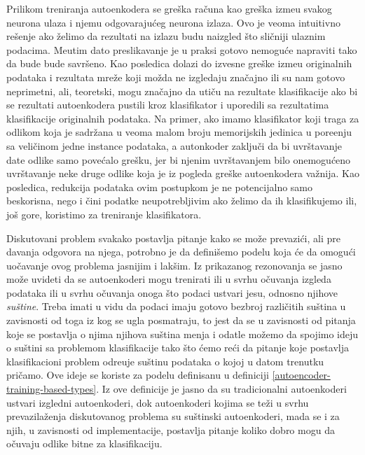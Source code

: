 \documentclass{article}
\begin{document}
	Prilikom treniranja autoenkodera se gre\v ska ra\v cuna kao gre\v ska izme\dj u svakog neurona ulaza i njemu odgovaraju\'ceg neurona izlaza. 
	Ovo je veoma intuitivno re\v senje ako \v zelimo da rezultati na izlazu budu naizgled \v sto sli\v cniji ulaznim podacima. 
	Me\dj utim dato preslikavanje je u praksi gotovo nemogu\'ce napraviti tako da bude bude savr\v seno.
	Kao posledica dolazi do izvesne gre\v ske izme\dj u originalnih podataka i rezultata mre\v ze koji mo\v zda ne izgledaju zna\v cajno ili su nam gotovo neprimetni, ali, teoretski, mogu zna\v cajno da uti\v cu na rezultate klasifikacije ako bi se rezultati autoenkodera pustili kroz klasifikator i uporedili sa rezultatima klasifikacije originalnih podataka.
	Na primer, ako imamo klasifikator koji traga za odlikom koja je sadr\v zana u veoma malom broju memorijskih jedinica u pore\dj enju sa veli\v cinom jedne instance podataka, a autonkoder zaklju\v ci da bi uvr\v stavanje date odlike samo pove\'calo gre\v sku, jer bi njenim uvr\v stavanjem bilo onemogu\'ceno uvr\v stavanje neke druge odlike koja je iz pogleda gre\v ske autoenkodera va\v znija.
	Kao posledica, redukcija podataka ovim postupkom je ne potencijalno samo beskorisna, nego i \v cini podatke neupotrebljivim ako \v zelimo da ih klasifikujemo ili, jo\v s gore, koristimo za treniranje klasifikatora.
	
	Diskutovani problem svakako postavlja pitanje kako se mo\v ze prevazi\'ci, ali pre davanja odgovora na njega, potrobno je da defini\v semo podelu koja \'ce da omogu\'ci uo\v cavanje ovog problema jasnijim i lak\v sim. 
	Iz prikazanog rezonovanja se jasno mo\v ze uvideti da se autoenkoderi mogu trenirati ili u svrhu o\v cuvanja izgleda podataka ili u svrhu o\v cuvanja onoga \v sto podaci ustvari jesu, odnosno njihove \emph{su\v stine}.
	Treba imati u vidu da podaci imaju gotovo bezbroj razli\v citih su\v stina u zavisnosti od toga iz kog se ugla posmatraju, to jest da se u zavisnosti od pitanja koje se postavlja o njima njihova su\v stina menja i odatle mo\v zemo da spojimo ideju o su\v stini sa problemom klasifikacije tako \v sto \'cemo re\'ci da pitanje koje postavlja klasifikacioni problem odre\dj uje su\v stinu podataka o kojoj u datom trenutku pri\v camo.
	Ove ideje se koriste za podelu definisanu u definiciji \ref{autoencoder-training-based-types}. Iz ove definicije je jasno da su tradicionalni autoenkoderi ustvari izgledni autoenkoderi, dok autoenkoderi kojima se te\v zi u svrhu prevazila\v zenja diskutovanog problema su su\v stinski autoenkoderi, mada se i za njih, u zavisnosti od implementacije, postavlja pitanje koliko dobro mogu da o\v cuvaju odlike bitne za klasifikaciju.
	
\end{document}
